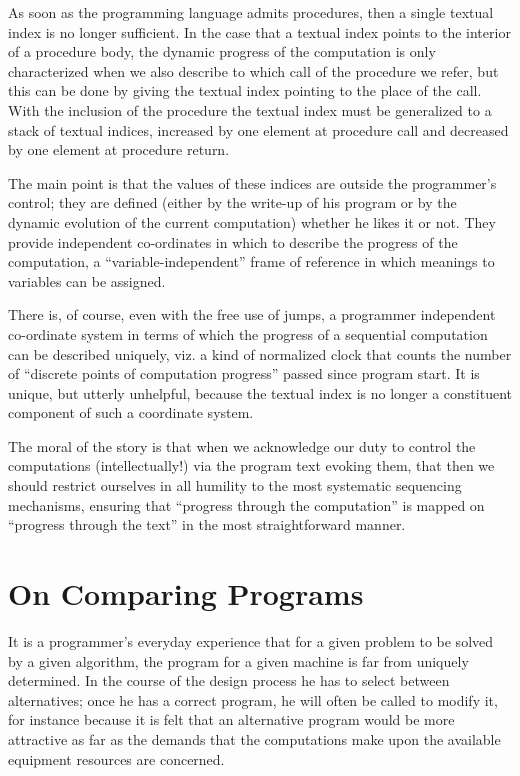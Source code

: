 \documentclass[twoside,11pt]{book}
\begin{document}
As soon as the programming language admits procedures, then a single textual index is no longer sufficient. In the case that a textual index points to the interior of a procedure body, the dynamic progress of the computation is only characterized when we also describe to which call of the procedure we refer, but this can be done by giving the textual index pointing to the place of the call. With the inclusion of the procedure the textual index must be generalized to a stack of textual indices, increased by one element at procedure call and decreased by one element at procedure return.

The main point is that the values of these indices are outside the programmer's control; they are defined (either by the write-up of his program or by the dynamic evolution of the current computation) whether he likes it or not. They provide independent co-ordinates in which to describe the progress of the computation, a ``variable-independent'' frame of reference in which meanings to variables can be assigned.

There is, of course, even with the free use of jumps, a programmer independent co-ordinate system in terms of which the progress of a sequential computation can be described uniquely, viz. a kind of normalized clock that counts the number of ``discrete points of computation progress'' passed since program start. It is unique, but utterly unhelpful, because the textual index is no longer a constituent component of such a coordinate system.

The moral of the story is that when we acknowledge our duty to control the computations (intellectually!) via the program text evoking them, that then we should restrict ourselves in all humility to the most systematic sequencing mechanisms, ensuring that ``progress through the computation'' is mapped on ``progress through the text'' in the most straightforward manner.

\section[On comparing programs]{On Comparing Programs}
\label{sec:comparing-programs}

It is a programmer's everyday experience that for a given problem to be solved by a given algorithm, the program for a given machine is far from uniquely determined. In the course of the design process he has to select between alternatives; once he has a correct program, he will often be called to modify it, for instance because it is felt that an alternative program would be more attractive as far as the demands that the computations make upon the available equipment resources are concerned.
\end{document}
